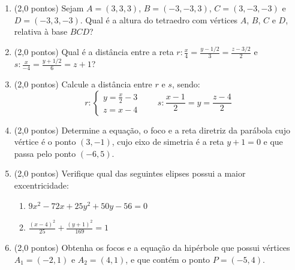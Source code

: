 \documentclass[12pt,a4paper]{article}
\begin{document}
\begin{enumerate}
\item (2,0 pontos) Sejam $A=(3,3,3)$, $B=(-3,-3,3)$, $C=(3,-3,-3)$ e $D=(-3,3,-3)$. Qual é a altura do tetraedro com vértices $A$, $B$, $C$ e $D$, relativa à base $BCD$?

\item (2,0 pontos) Qual é a distância entre a reta
$r: \frac{x}{4} = \frac{y-1/2}{3} = \frac{z-3/2}{2}$ e
$s: \frac{x}{-4} = \frac{y+1/2}{6} = z+1$?

\item (2,0 pontos) Calcule a distância entre $r$ e $s$, sendo:
\[
r: \begin{cases}
y = \frac{x}{2} - 3\\
z= x - 4 \qquad
\end{cases}
s: \frac{x-1}{2} = y = \frac{z-4}{2}
\]

\item (2,0 pontos) Determine a equação, o foco e a reta diretriz da parábola cujo vértice é o ponto $(3,-1)$, cujo eixo de simetria é a reta $y+1=0$ e que passa pelo ponto $(-6,5)$.

\item (2,0 pontos) Verifique qual das seguintes elipses possui a maior excentricidade:
\begin{multicols}{2}
\begin{enumerate}
\item $9 x^2-72 x+25 y^2+50 y-56 = 0$
\item $\frac{(x-4)^2}{25} + \frac{(y+1)^2}{169} = 1$
\end{enumerate}
\end{multicols}

\item (2,0 pontos) Obtenha os focos e a equação da hipérbole que possui vértices $A_1=(-2,1)$ e $A_2 = (4,1)$, e que contém o ponto $P = (-5,4)$.
\end{enumerate}

\newpage
\restoregeometry
\end{document}
